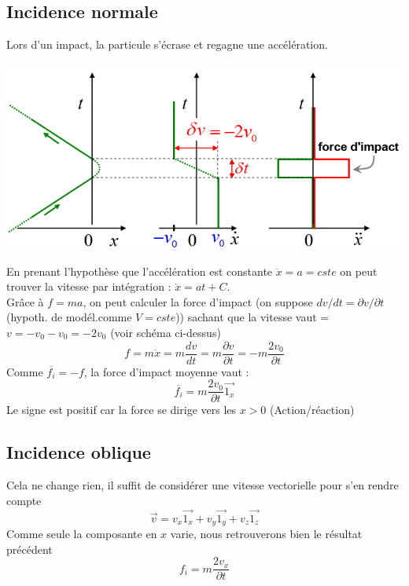 \documentclass	[11pt, a4paper, openany]{book}
\begin{document}
\subsection{Incidence normale}
Lors d'un impact, la particule s'écrase et regagne une accélération.
\begin{center}
	\includegraphics[scale=0.4]{th/image6.png}
\end{center}
En prenant l'hypothèse que l'accélération est constante $\ddot{x} = a = cste$ on peut trouver la vitesse par intégration  : $\dot{x} = at + C$.\\
Grâce à $f = ma$, on peut calculer la force d'impact (on suppose $dv/dt = \partial v / \partial t$ (hypoth. de modél.comme $V = cste$)) sachant que la vitesse vaut = $v = -v_0 - v_0 = -2v_0$ (voir schéma ci-dessus)
\begin{equation}
	f = m\ddot{x} = m\frac{dv}{dt} = m\frac{\partial v}{\partial t} = -m\frac{2v_0}{\partial t}
\end{equation}
Comme $\overline{f_i} = -f$, la force d'impact moyenne vaut :
\begin{equation}
	\overline{f_i} = m \frac{2v_0}{\partial t}\vec{1_x}
\end{equation}
Le signe est positif car la force se dirige vers les $x > 0$  (Action/réaction)

\subsection{Incidence oblique}
Cela ne change rien, il suffit de considérer une vitesse vectorielle pour s'en rendre compte
\begin{equation}
	\vec v = v_x \vec{1_x} + v_y \vec{1_y} + v_z \vec{1_z}
\end{equation}
Comme seule la composante en $x$ varie, nous retrouverons bien le résultat précédent 
\begin{equation}
	f_i = m\frac{2v_x}{\partial t}
\end{equation}
\end{document}
